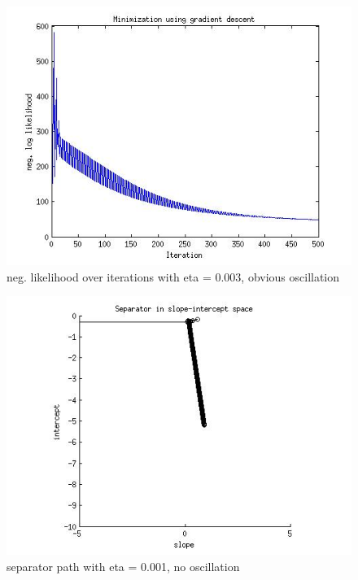 \documentclass[paper=a4, fontsize=15pt]{article} %
\begin{document}
\begin{enumerate}
\begin{figure}[hb]
\includegraphics[width=\linewidth]{./a2_datacode/lr/fig3_gd.jpg}
\caption{neg. likelihood over iterations with eta = 0.003, obvious oscillation}
\label{fig:sg3}
\end{figure}
\begin{figure}[hb]
\includegraphics[width=\linewidth]{./a2_datacode/lr/fig2_gd_001.jpg}
\caption{separator path with eta = 0.001, no oscillation}
\label{fig:sg2001}
\end{figure}
\begin{figure}[hb]

\end{figure}
\end{enumerate}
\end{document}
